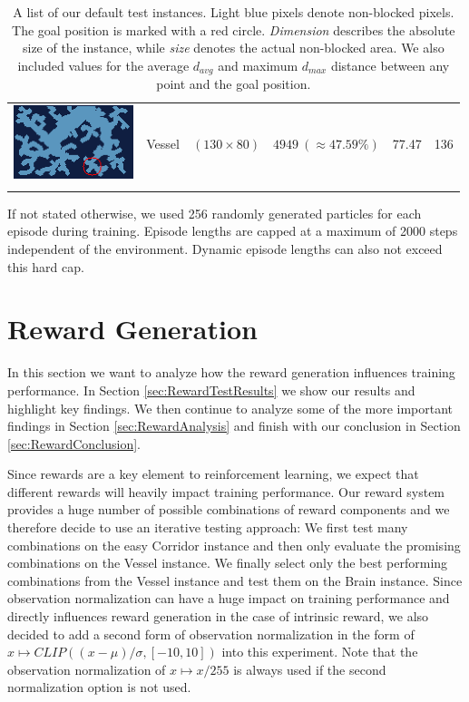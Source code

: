 \begin{table} [h!]
\begin{center}
\begin{tabular}{cccccc}
            \parbox[c]{3.5cm}{\includegraphics[clip, width=3.5cm]{figures/evaluation/procedure/vessel_upscaled.png}} & Vessel & $(130 \times 80)$ & $4949 \ (\approx 47.59\%)$ & 77.47 & 136 \\
            \addlinespace[0.05cm]
            \bottomrule
        \end{tabular}
    \end{center}
    \caption[Test Instances]{A list of our default test instances. Light blue pixels denote non-blocked pixels. The goal position is marked with a red circle. \textit{Dimension} describes the absolute size of the instance, while \textit{size} denotes the actual non-blocked area. We also included values for the average $d_{avg}$ and maximum $d_{max}$ distance between any point and the goal position.} \label{tab:TestInstances}
\end{table}

If not stated otherwise, we used 256 randomly generated particles for each episode during training. Episode lengths are capped at a maximum of 2000 steps independent of the environment. Dynamic episode lengths can also not exceed this hard cap.

\section{Reward Generation} \label{sec:EvalReward}
In this section we want to analyze how the reward generation influences training performance. In Section \ref{sec:RewardTestResults} we show our results and highlight key findings. We then continue to analyze some of the more important findings in Section \ref{sec:RewardAnalysis} and finish with our conclusion in Section \ref{sec:RewardConclusion}.

Since rewards are a key element to reinforcement learning, we expect that different rewards will heavily impact training performance. Our reward system provides a huge number of possible combinations of reward components and we therefore decide to use an iterative testing approach: We first test many combinations on the easy Corridor instance and then only evaluate the promising combinations on the Vessel instance. We finally select only the best performing combinations from the Vessel instance and test them on the Brain instance. Since observation normalization can have a huge impact on training performance and directly influences reward generation in the case of intrinsic reward, we also decided to add a second form of observation normalization in the form of $x \mapsto CLIP((x - \mu)/\sigma, [-10, 10])$ into this experiment. Note that the observation normalization of $x \mapsto x/255$ is always used if the second normalization option is not used.

